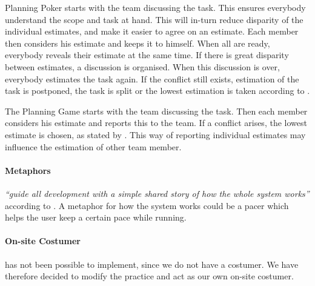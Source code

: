 Planning Poker starts with the team discussing the task. This ensures everybody understand the scope and task at hand. This will in-turn reduce disparity of the individual estimates, and make it easier to agree on an estimate. Each member then considers his estimate and keeps it to himself. When all are ready, everybody reveals their estimate at the same time. If there is great disparity between estimates, a discussion is organised. When this discussion is over, everybody estimates the task again. If the conflict still exists, estimation of the task is postponed, the task is split or the lowest estimation is taken according to \citet[p. 1]{xp:planningPoker}.

The Planning Game starts with the team discussing the task. Then each member considers his estimate and reports this to the team. If a conflict arises, the lowest estimate is chosen, as stated by \citet[p. 58]{xp:planning}.
This way of reporting individual estimates may influence the estimation of other team member. 
 

\paragraph{Metaphors} \textit{``guide all development with a simple shared story of how the whole system works''} according to \cite[p.54]{xp:planning}. A metaphor for how the system works could be a pacer which helps the user keep a certain pace while running.

\paragraph{On-site Costumer} has not been possible to implement, since we do not have a costumer. We have therefore decided to modify the practice and act as our own on-site costumer.

